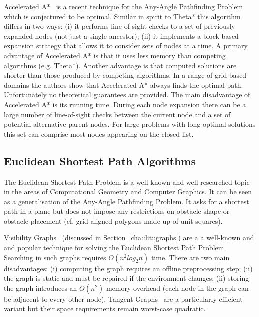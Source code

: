 Accelerated A*~\citep{sislak09a,sislak09b} is a recent technique for the Any-Angle Pathfinding
Problem which is conjectured to be optimal. Similar in spirit to Theta* this algorithm differs in
two ways: (i) it performs line-of-sight checks to a set of previously expanded nodes (not just a
single ancestor); (ii) it implements a block-based expansion strategy that allows it to consider
sets of nodes at a time.  
A primary advantage of Accelerated A* is that it uses less memory than competing algorithms (e.g.
Theta*).  Another advantage is that computed solutions are shorter than those produced by competing
algorithms. In a range of grid-based domains the authors show that Accelerated A* always finds the
optimal path.  Unfortunately no theoretical guarantees are provided.  The main disadvantage of
Accelerated A* is its running time. During each node expansion there can be a large number of
line-of-sight checks between the current node and a set of potential alternative parent nodes.  For
large problems with long optimal solutions this set can comprise most nodes appearing on the closed
list.


\subsection{Euclidean Shortest Path Algorithms}
\label{cha::lit::euclidean::euclidean}
The Euclidean Shortest Path Problem is a well known and well researched topic in the areas of
Computational Geometry and Computer Graphics. It can be seen as a generalisation of the Any-Angle 
Pathfinding Problem. It asks for a shortest path in a plane but does not impose any restrictions on
obstacle shape or obstacle placement (cf. grid aligned polygons made up of unit squares). 

Visibility Graphs~\citep{lozanoperez79} (discussed in Section~\ref{cha::lit::graphs})
are a a well-known and and popular technique for solving the Euclidean Shortest Path 
Problem. Searching in such graphs requires $O(n^2log_{2}{n})$ time.  There are two 
main disadvantages: (i) computing the graph requires an offline preprocessing step;
(ii) the graph is static and must be repaired if the environment changes;
(ii) storing the graph introduces an $O(n^2)$ memory overhead (each node in 
the graph can be adjacent to every other node). Tangent Graphs~\citep{liu92} are a 
particularly efficient variant but their space requirements remain worst-case 
quadratic. 

